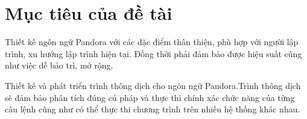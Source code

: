 \section{Mục tiêu của đề tài}
Thiết kế ngôn ngữ Pandora với các đặc điểm thân thiện, phù hợp với người lập trình, xu hướng lập trình hiện tại. Đồng thời phải đảm bảo được hiệu suất cũng như việc dễ bảo trì, mở rộng.

Thiết kế và phát triển trình thông dịch cho ngôn ngữ Pandora.Trình thông dịch sẽ đảm bảo phân tích đúng cú pháp và thực thi chính xác chức năng của từng câu lệnh cũng như có thể thực thi chương trình trên nhiều hệ thống khác nhau.